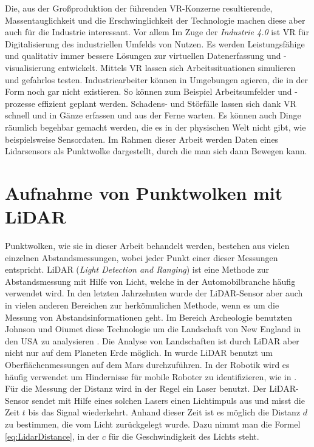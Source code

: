 Die, aus der Großproduktion der führenden VR-Konzerne resultierende, Massentauglichkeit und die Erschwinglichkeit der Technologie machen diese aber auch für die Industrie interessant. Vor allem Im Zuge der \textit{Industrie 4.0} ist VR für Digitalisierung des industriellen Umfelds von Nutzen. Es werden Leistungsfähige und qualitativ immer bessere Lösungen zur virtuellen Datenerfassung und -visualisierung entwickelt. Mittels VR lassen sich Arbeitssituationen simulieren und gefahrlos testen. Industriearbeiter können in Umgebungen agieren, die in der Form noch gar nicht existieren. So können zum Beispiel Arbeitsumfelder und -prozesse effizient geplant werden. Schadens- und Störfälle lassen sich dank VR schnell und in Gänze erfassen und aus der Ferne warten. Es können auch Dinge räumlich begehbar gemacht werden, die es in der physischen Welt nicht gibt, wie beispielsweise Sensordaten. Im Rahmen dieser Arbeit werden Daten eines Lidarsensors als Punktwolke dargestellt, durch die man sich dann Bewegen kann.  

\section{Aufnahme von Punktwolken mit LiDAR}

Punktwolken, wie sie in dieser Arbeit behandelt werden, bestehen aus vielen einzelnen Abstandsmessungen, wobei jeder Punkt einer dieser Messungen entspricht. LiDAR (\textit{Light Detection and Ranging}) ist eine Methode zur Abstandsmessung mit Hilfe von Licht, welche in der Automobilbranche häufig verwendet wird. In den letzten Jahrzehnten wurde der LiDAR-Sensor aber auch in vielen anderen Bereichen zur herkömmlichen Methode, wenn es um die Messung von Abstandsinformationen geht. Im Bereich Archeologie benutzten Johnson und Oiumet diese Technologie um die Landschaft von New England in den USA zu analysieren \cite{bib:LidarArcheology}. Die Analyse von Landschaften ist durch LiDAR aber nicht nur auf dem Planeten Erde möglich. In \cite{bib:LidarSpace} wurde LiDAR benutzt um Oberflächenmessungen auf dem Mars durchzuführen. In der Robotik wird es häufig verwendet um Hindernisse für mobile Roboter zu identifizieren, wie in \cite{bib:LidarRobotic}.\\

Für die Messung der Distanz wird in der Regel ein Laser benutzt. Der LiDAR-Sensor sendet mit Hilfe eines solchen Lasers einen Lichtimpuls aus und misst die Zeit $t$ bis das Signal wiederkehrt. Anhand dieser Zeit ist es möglich die Distanz $d$ zu bestimmen, die vom Licht zurückgelegt wurde. Dazu nimmt man die Formel \ref{eq:LidarDistance}, in der $c$ für die Geschwindigkeit des Lichts steht.

